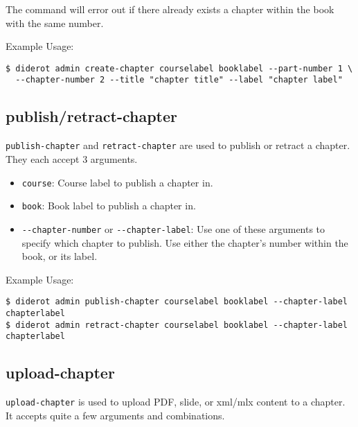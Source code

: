 The command will error out if there already exists a chapter within the book with the same number.

Example Usage:
\begin{verbatim}
$ diderot admin create-chapter courselabel booklabel --part-number 1 \
  --chapter-number 2 --title "chapter title" --label "chapter label"
\end{verbatim}

\subsection{publish/retract-chapter}

\verb|publish-chapter| and \verb|retract-chapter| are used to publish or retract a chapter. They each accept 3 arguments.

\begin{itemize}
  \item \verb|course|: Course label to publish a chapter in. 
  \item \verb|book|: Book label to publish a chapter in.

  \item \verb|--chapter-number| or \verb|--chapter-label|: Use one of these arguments to specify which chapter to publish. Use either the chapter's number within the book, or its label.
\end{itemize}

Example Usage:
\begin{verbatim}
$ diderot admin publish-chapter courselabel booklabel --chapter-label chapterlabel
$ diderot admin retract-chapter courselabel booklabel --chapter-label chapterlabel
\end{verbatim}

\subsection{upload-chapter}

\verb|upload-chapter| is used to upload PDF, slide, or xml/mlx content to a chapter.
%
It accepts quite a few arguments and combinations.

